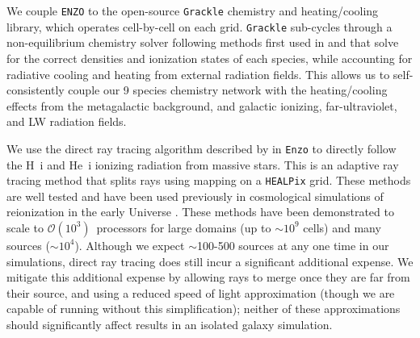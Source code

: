 \documentclass[11pt]{article}
\begin{document}
We couple \texttt{ENZO} to the open-source \texttt{Grackle} chemistry and heating/cooling library, which operates cell-by-cell on each grid. \texttt{Grackle} sub-cycles through a non-equilibrium chemistry solver following methods first used in \cite{Anninos1997} and \cite{Abel1997} that solve for the correct densities and ionization states of each species, while accounting for radiative cooling and heating from external radiation fields. This allows us to self-consistently couple our 9 species chemistry network with the heating/cooling effects from the metagalactic background, and galactic ionizing, far-ultraviolet, and LW radiation fields.


We use the direct ray tracing algorithm described by \cite{WiseAbel2011} in \texttt{Enzo} to directly follow the H~{\sc i} and He~{\sc i} ionizing radiation from massive stars. This is an adaptive ray tracing method that splits rays using mapping on a \texttt{HEALPix} grid. These methods are well tested and have been used previously in cosmological simulations of reionization in the early Universe \citep{Wise2012a, WiseAbel2012,Wise2014, Kim2013a, Kim2013b}. These methods have been demonstrated to scale to $\mathcal{O}(10^{3})$~processors for large domains (up to $\sim 10^9$ cells) and many sources ($\sim10^{4}$). Although we expect $\sim$100-500 sources at any one time in our simulations, direct ray tracing does still incur a significant additional expense. We mitigate this additional expense by allowing rays to merge once they are far from their source, and using a reduced speed of light approximation (though we are capable of running without this simplification); neither of these approximations should significantly affect results in an isolated galaxy simulation. 
\end{document}
